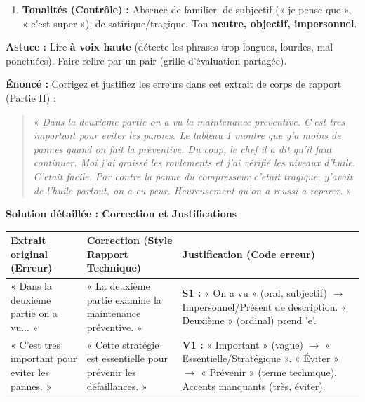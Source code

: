 \documentclass[11pt]{article}
\begin{document}
\begin{methode}
\begin{enumerate}
\begin{itemize}
                \item [ ] \textbf{Présentation :} Police unique (Times New Roman 12), interligne 1.5, marges normales, pagination, titres hiérarchisés (gras/souligné), figures/tableaux légendés et centrés.
            \end{itemize}
        \item \textbf{Tonalités (Contrôle) :} Absence de familier, de subjectif (« je pense que », « c'est super »), de satirique/tragique. Ton \textbf{neutre, objectif, impersonnel}.
    \end{enumerate}
    \textbf{Astuce :} Lire \textbf{à voix haute} (détecte les phrases trop longues, lourdes, mal ponctuées). Faire relire par un pair (grille d'évaluation partagée).
\end{methode}

\begin{exoresolu}
    \textbf{Énoncé :} Corrigez et justifiez les erreurs dans cet extrait de corps de rapport (Partie II) :
    \begin{quote}
        « \emph{Dans la deuxieme partie on a vu la maintenance preventive. C'est tres important pour eviter les pannes. Le tableau 1 montre que y'a moins de pannes quand on fait la preventive. Du coup, le chef il a dit qu'il faut continuer. Moi j'ai graissé les roulements et j'ai vérifié les niveaux d'huile. C'etait facile. Par contre la panne du compresseur c'etait tragique, y'avait de l'huile partout, on a eu peur. Heureusement qu'on a reussi a reparer. } »
    \end{quote}
    \tcblower
    \textbf{Solution détaillée : Correction et Justifications}
    \begin{center}
        \begin{tabularx}{\linewidth}{|l|X|X|}\hline
        \rowcolor{popblueL} \textbf{Extrait original (Erreur)} & \textbf{Correction (Style Rapport Technique)} & \textbf{Justification (Code erreur)} \\\hline
        « Dans la deuxieme partie on a vu... » & « La deuxième partie examine la maintenance préventive. » & \textbf{S1 :} « On a vu » (oral, subjectif) $\rightarrow$ Impersonnel/Présent de description. « Deuxième » (ordinal) prend 'e'. \\\hline
        « C'est tres important pour eviter les pannes. » & « Cette stratégie est essentielle pour prévenir les défaillances. » & \textbf{V1 :} « Important » (vague) $\rightarrow$ « Essentielle/Stratégique ». « Éviter » $\rightarrow$ « Prévenir » (terme technique). Accents manquants (très, éviter). \\\hline

\end{tabularx}
\end{center}
\end{exoresolu}
\end{document}
